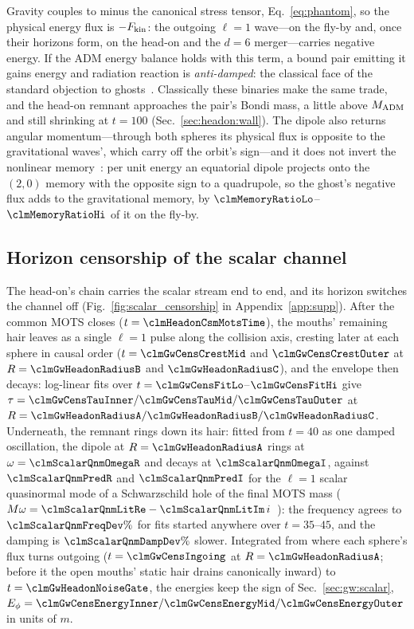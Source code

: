 \documentclass[twocolumn,floatfix,aps,prd,superscriptaddress,nofootinbib]{revtex4-2}
\begin{document}
Gravity couples to minus the canonical stress tensor, Eq.~\eqref{eq:phantom}, so the physical energy flux is $-F_{\rm kin}$: the outgoing $\ell=1$ wave---on the fly-by and, once their horizons form, on the head-on and the $d=6$ merger---carries negative energy. If the ADM energy balance holds with this term, a bound pair emitting it gains energy and radiation reaction is \emph{anti-damped}: the classical face of the standard objection to ghosts~\cite{carroll2003,cline2004}. Classically these binaries make the same trade, and the head-on remnant approaches the pair's Bondi mass, a little above $M_{\rm ADM}$ and still shrinking at $t=100$ (Sec.~\ref{sec:headon:wall}). The dipole also returns angular momentum---through both spheres its physical flux is opposite to the gravitational waves', which carry off the orbit's sign---and it does not invert the nonlinear memory~\cite{christodoulou1991,thorne1992,favata2009}: per unit energy an equatorial dipole projects onto the $(2,0)$ memory with the opposite sign to a quadrupole, so the ghost's negative flux adds to the gravitational memory, by $\clmMemoryRatioLo$--$\clmMemoryRatioHi$ of it on the fly-by.

\subsection{Horizon censorship of the scalar channel}
\label{sec:gw:censorship}

The head-on's chain carries the scalar stream end to end, and its horizon switches the channel off (Fig.~\ref{fig:scalar_censorship} in Appendix~\ref{app:supp}). After the common MOTS closes ($t=\clmHeadonCsmMotsTime$), the mouths' remaining hair leaves as a single $\ell=1$ pulse along the collision axis, cresting later at each sphere in causal order ($t=\clmGwCensCrestMid$ and $\clmGwCensCrestOuter$ at $R=\clmGwHeadonRadiusB$ and $\clmGwHeadonRadiusC$), and the envelope then decays: log-linear fits over $t=\clmGwCensFitLo$--$\clmGwCensFitHi$ give $\tau=\clmGwCensTauInner/\clmGwCensTauMid/\clmGwCensTauOuter$ at $R=\clmGwHeadonRadiusA/\clmGwHeadonRadiusB/\clmGwHeadonRadiusC$. Underneath, the remnant rings down its hair: fitted from $t=40$ as one damped oscillation, the dipole at $R=\clmGwHeadonRadiusA$ rings at $\omega=\clmScalarQnmOmegaR$ and decays at $\clmScalarQnmOmegaI$, against $\clmScalarQnmPredR$ and $\clmScalarQnmPredI$ for the $\ell=1$ scalar quasinormal mode of a Schwarzschild hole of the final MOTS mass ($M\omega=\clmScalarQnmLitRe-\clmScalarQnmLitIm\,i$~\cite{berti2009}): the frequency agrees to $\clmScalarQnmFreqDev\%$ for fits started anywhere over $t=35$--$45$, and the damping is $\clmScalarQnmDampDev\%$ slower. Integrated from where each sphere's flux turns outgoing ($t=\clmGwCensIngoing$ at $R=\clmGwHeadonRadiusA$; before it the open mouths' static hair drains canonically inward) to $t=\clmGwHeadonNoiseGate$, the energies keep the sign of Sec.~\ref{sec:gw:scalar}, $E_\phi=\clmGwCensEnergyInner/\clmGwCensEnergyMid/\clmGwCensEnergyOuter$ in units of $m$.
\end{document}
